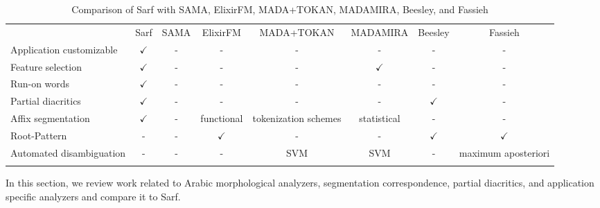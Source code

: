 \begin{table}[tb]
\centering
\begin{minipage}{\textwidth}
\caption{\label{tab:comparison}Comparison of Sarf with SAMA, 
ElixirFM, MADA+TOKAN, MADAMIRA, Beesley, and Fassieh}
 {
  \begin{tabular}{lccccccc}\toprule
             & Sarf & SAMA & ElixirFM & MADA+TOKAN & MADAMIRA & Beesley & Fassieh\\ \colrule
Application customizable & $\checkmark$ & - & - & - &  - & - & - \\[4pt]
Feature selection & $\checkmark$ & - & - &  - & $\checkmark$ & - & - \\[4pt]
Run-on words & $\checkmark$ & - & - & - & - & - & - \\[4pt]
Partial diacritics & $\checkmark$ & - & - & - & - & $\checkmark$ & - \\[4pt]
Affix segmentation & $\checkmark$ & - & functional & tokenization schemes & statistical & - & - \\[4pt]
Root-Pattern & - & - & $\checkmark$ & - & - & $\checkmark$ & $\checkmark$ \\[4pt]
Automated disambiguation & - & - & - & SVM & SVM & - & maximum  aposteriori  \\ 
\botrule
\end{tabular}
}
\end{minipage}
\end{table}


In this section, we review work related to Arabic morphological analyzers,
segmentation correspondence, 
partial diacritics, and application specific analyzers and compare it to Sarf.

